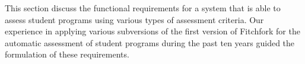This section discuss the functional requirements for a system that is able to assess student programs using various types of assessment criteria. Our experience in applying various subversions of the first version of Fitchfork for the automatic assessment of student programs during the past ten years guided the formulation of these requirements.